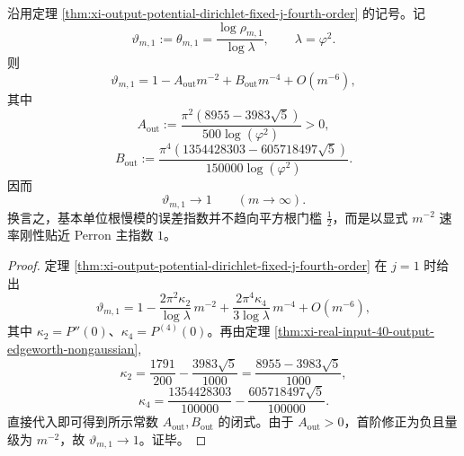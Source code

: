 \begin{theorem}\label{thm:xi-time-part9w-basic-root-unity-error-exponent-to-one}
沿用定理 \ref{thm:xi-output-potential-dirichlet-fixed-j-fourth-order} 的记号。记
\[
\vartheta_{m,1}:=\theta_{m,1}
=\frac{\log\rho_{m,1}}{\log\lambda},
\qquad
\lambda=\varphi^2.
\]
则
\[
\vartheta_{m,1}
=
1-A_{\mathrm{out}}m^{-2}
+B_{\mathrm{out}}m^{-4}
+O(m^{-6}),
\]
其中
\[
A_{\mathrm{out}}
:=
\frac{\pi^2(8955-3983\sqrt5)}{500\log(\varphi^2)}
>0,
\]
\[
B_{\mathrm{out}}
:=
\frac{\pi^4(1354428303-605718497\sqrt5)}{150000\log(\varphi^2)}.
\]
因而
\[
\vartheta_{m,1}\longrightarrow 1
\qquad(m\to\infty).
\]
换言之，基本单位根慢模的误差指数并不趋向平方根门槛 \(\tfrac12\)，而是以显式 \(m^{-2}\) 速率刚性贴近 Perron 主指数 \(1\)。
\end{theorem}
\begin{proof}
定理 \ref{thm:xi-output-potential-dirichlet-fixed-j-fourth-order} 在 \(j=1\) 时给出
\[
\vartheta_{m,1}
=
1-\frac{2\pi^2\kappa_2}{\log\lambda}\,m^{-2}
+\frac{2\pi^4\kappa_4}{3\log\lambda}\,m^{-4}
+O(m^{-6}),
\]
其中 \(\kappa_2=P''(0)\)、\(\kappa_4=P^{(4)}(0)\)。再由定理 \ref{thm:xi-real-input-40-output-edgeworth-nongaussian},
\[
\kappa_2=\frac{1791}{200}-\frac{3983\sqrt5}{1000}
=\frac{8955-3983\sqrt5}{1000},
\]
\[
\kappa_4=\frac{1354428303}{100000}-\frac{605718497\sqrt5}{100000}.
\]
直接代入即可得到所示常数 \(A_{\mathrm{out}},B_{\mathrm{out}}\) 的闭式。由于 \(A_{\mathrm{out}}>0\)，首阶修正为负且量级为 \(m^{-2}\)，故 \(\vartheta_{m,1}\to1\)。证毕。
\end{proof}

